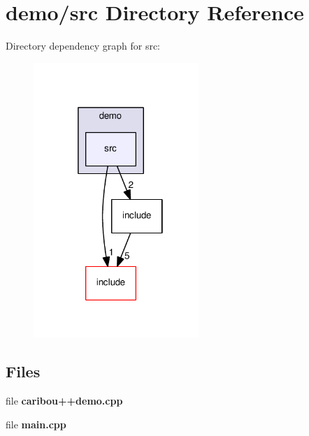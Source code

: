 \section{demo/src Directory Reference}
\label{dir_439e122854185c7ba7bec64e8a7afda2}
Directory dependency graph for src\+:
\nopagebreak
\begin{figure}[H]
\begin{center}
\leavevmode
\includegraphics[width=178pt]{dir_439e122854185c7ba7bec64e8a7afda2_dep}
\end{center}
\end{figure}
\subsection*{Files}
\begin{DoxyCompactItemize}
\item 
file {\bf caribou++demo.\+cpp}
\item 
file {\bf main.\+cpp}
\end{DoxyCompactItemize}
